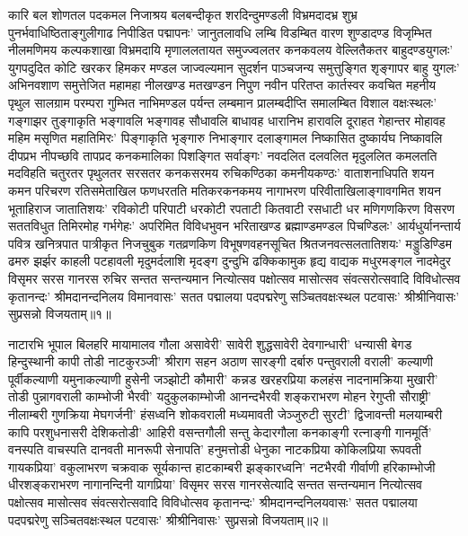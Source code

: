 \begin{flushleft}
कारि बल शोणतल पदकमल निजाश्रय बलबन्दीकृत शरदिन्दुमण्डली विभ्रमदादभ्र शुभ्र पुनर्भवाधिष्ठिताङ्गुलीगाढ निपीडित पद्मापनः' जानुतलावधि लम्बि विडम्बित वारण शुण्डादण्ड विजृम्भित नीलमणिमय कल्पकशाखा विभ्रमदायि मृणाललतायत समुज्ज्वलतर कनकवलय वेल्लितैकतर बाहुदण्डयुगलः' युगपदुदित कोटि खरकर हिमकर मण्डल जाज्वल्यमान सुदर्शन पाञ्चजन्य समुत्तुङ्गित शृङ्गापर बाहु युगलः' अभिनवशाण समुत्तेजित महामहा नीलखण्ड मतखण्डन निपुण नवीन परितप्त कार्तस्वर कवचित महनीय पृथुल सालग्राम परम्परा गुम्भित नाभिमण्डल पर्यन्त लम्बमान प्रालम्बदीप्ति समालम्बित विशाल वक्षःस्थलः' गङ्गाझर तुङ्गाकृति भङ्गावलि भङ्गावह सौधावलि बाधावह धारानिभ हारावलि दूराहत गेहान्तर मोहावह महिम मसृणित महातिमिरः' पिङ्गाकृति भृङ्गारु निभाङ्गार दलाङ्गामल निष्कासित दुष्कार्यघ निष्कावलि दीपप्रभ नीपच्छवि तापप्रद कनकमालिका पिशङ्गित सर्वाङ्गः' नवदलित दलवलित मृदुललित कमलतति मदविहति चतुरतर पृथुलतर सरसतर कनकसरमय रुचिकण्ठिका कमनीयकण्ठः' वाताशनाधिपति शयन कमन परिचरण रतिसमेताखिल फणधरतति मतिकरकनकमय नागाभरण परिवीताखिलाङ्गावगमित शयन भूताहिराज जातातिशयः' रविकोटी परिपाटी धरकोटी रपताटी कितवाटी रसधाटी धर मणिगणकिरण विसरण सततविधुत तिमिरमोह गर्भगेहः' अपरिमित विविधभुवन भरिताखण्ड ब्रह्माण्डमण्डल पिचण्डिलः' आर्यधुर्यानन्तार्य पवित्र खनित्रपात पात्रीकृत निजचुबुक गतव्रणकिण विभूषणवहनसूचित श्रितजनवत्सलतातिशयः' मड्डुडिण्डिम ढमरु झर्झर काहली पटहावली मृदुमर्दलाशि मृदङ्ग दुन्दुभि ढक्किकामुक हृद्य वाद्यक मधुरमङ्गल नादमेदुर विसृमर सरस गानरस रुचिर सन्तत सन्तन्यमान नित्योत्सव पक्षोत्सव मासोत्सव संवत्सरोत्सवादि विविधोत्सव कृतानन्दः' श्रीमदानन्दनिलय विमानवासः' सतत पद्मालया पदपद्मरेणु सञ्चितवक्षःस्थल पटवासः' श्रीश्रीनिवासः' सुप्रसन्नो विजयताम्॥१॥

नाटारभि भूपाल बिलहरि मायामालव गौला असावेरी' सावेरी
शुद्धसावेरी देवगान्धारी' धन्यासी बेगड हिन्दुस्थानी कापी तोडी नाटकुरञ्जी' श्रीराग सहन अठाण सारङ्गी दर्बारु पन्तुवराली वराली' कल्याणी पूर्वीकल्याणी यमुनाकल्याणी हुसेनी जञ्झोटी कौमारी'
कन्नड खरहरप्रिया कलहंस नादनामक्रिया मुखारी' तोडी पुन्नागवराली
काम्भोजी भैरवी' यदुकुलकाम्भोजी आनन्दभैरवी शङ्कराभरण मोहन
रेगुप्ती सौराष्ट्री' नीलाम्बरी गुणक्रिया मेघगर्जनी' हंसध्वनि शोकवराली मध्यमावती जेञ्जुरुटी सुरटी' द्विजावन्ती मलयाम्बरी कापि
परशुधनासरी देशिकतोडी' आहिरी वसन्तगौली सन्तु केदारगौला कनकाङ्गी रत्नाङ्गी गानमूर्ति' वनस्पति वाचस्पति दानवती मानरूपी सेनापति' हनुमत्तोडी धेनुका नाटकप्रिया कोकिलप्रिया रूपवती गायकप्रिया' वकुलाभरण चक्रवाक सूर्यकान्त हाटकाम्बरी
झङ्कारध्वनि' नटभैरवी गीर्वाणी हरिकाम्भोजी धीरशङ्कराभरण नागानन्दिनी यागप्रिया' विसृमर सरस गानरसेत्यादि सन्तत
सन्तन्यमान नित्योत्सव पक्षोत्सव मासोत्सव संवत्सरोत्सवादि
विविधोत्सव कृतानन्दः' श्रीमदानन्दनिलयवासः' सतत पद्मालया पदपद्मरेणु सञ्चितवक्षःस्थल पटवासः' श्रीश्रीनिवासः' सुप्रसन्नो विजयताम्॥२॥


\end{flushleft}
